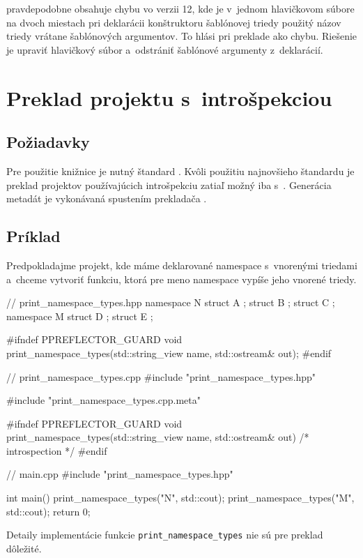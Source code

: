 \Clang{} pravdepodobne obsahuje chybu vo verzii 12, kde je v~jednom hlavičkovom súbore na dvoch miestach pri deklarácii konštruktoru šablónovej triedy použitý názov triedy vrátane šablónových argumentov. To \GCCV{} hlási pri preklade \PPreflector{} ako chybu. Riešenie je upraviť hlavičkový súbor a~odstrániť šablónové argumenty z~deklarácií.

\section{Preklad projektu s~introšpekciou}

\subsection{Požiadavky}

Pre použitie knižnice \PPreflection{} je nutný štandard \CppV{}. Kvôli použitiu najnovšieho štandardu je preklad projektov používajúcich introšpekciu zatiaľ možný iba s~\GCCV{}. Generácia metadát je vykonávaná spustením prekladača \ClangV{}.

\subsection{Príklad}

Predpokladajme projekt, kde máme deklarované namespace s~vnorenými triedami a~chceme vytvoriť funkciu, ktorá pre meno namespace vypíše jeho vnorené triedy.
\begin{code}[fontsize=\footnotesize]
// print_namespace_types.hpp
namespace N { struct A {}; struct B {}; struct C {}; }
namespace M { struct D {}; struct E {}; }

#ifndef PPREFLECTOR_GUARD
void print_namespace_types(std::string_view name, std::ostream& out);
#endif

// print_namespace_types.cpp
#include "print_namespace_types.hpp"

#include "print_namespace_types.cpp.meta"

#ifndef PPREFLECTOR_GUARD
void print_namespace_types(std::string_view name, std::ostream& out)
{ /* introspection */ }
#endif

// main.cpp
#include "print_namespace_types.hpp"

int main()
{   print_namespace_types("N", std::cout);
    print_namespace_types("M", std::cout);
    return 0;
}
\end{code}
Detaily implementácie funkcie \texttt{print\_namespace\_types} nie sú pre preklad dôležité.

